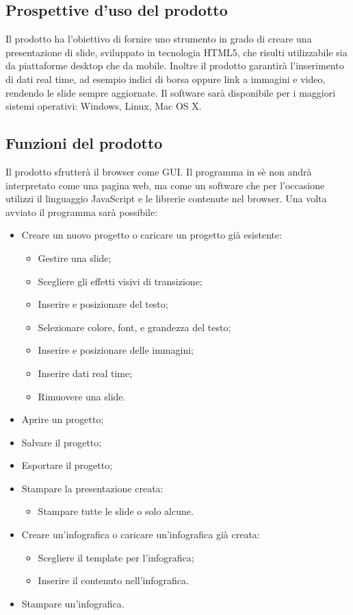 \subsection{Prospettive d'uso del prodotto}
Il prodotto ha l'obiettivo di fornire uno strumento in grado di creare una presentazione di slide, sviluppato in tecnologia \gls{HTML5}, che risulti utilizzabile sia da piattaforme desktop che da mobile. Inoltre il prodotto garantirà l'inserimento di dati real time, ad esempio indici di borsa oppure link a immagini e video, rendendo le slide sempre aggiornate. Il software sarà disponibile per i maggiori sistemi operativi: Windows, Linux, Mac OS X.

\subsection{Funzioni del prodotto}
Il prodotto sfrutterà il browser come GUI. Il programma in sè non andrà interpretato come una pagina web, ma come un software che per l'occasione utilizzi il linguaggio JavaScript e le librerie contenute nel browser.
Una volta avviato il programma sarà possibile:
\begin{itemize}
	\item Creare un nuovo progetto o caricare un progetto già esistente:
	\begin{itemize}
		\item Gestire una slide;
		\item Scegliere gli effetti visivi di transizione;
		\item Inserire e posizionare del testo;
		\item Selezionare colore, font, e grandezza del testo;
		\item Inserire e posizionare delle immagini;
		\item Inserire dati real time;
		\item Rimuovere una slide.
	\end{itemize}
	\item Aprire un progetto;
	\item Salvare il progetto;
	\item Esportare il progetto;
	\item Stampare la presentazione creata:
	\begin{itemize}
		\item Stampare tutte le slide o solo alcune.
	\end{itemize}
	\item Creare un'infografica o caricare un'infografica già creata:
	\begin{itemize}
		\item Scegliere il template per l'infografica;
		\item Inserire il contenuto nell'infografica.
	\end{itemize}
	\item Stampare un'infografica.
\end{itemize}

